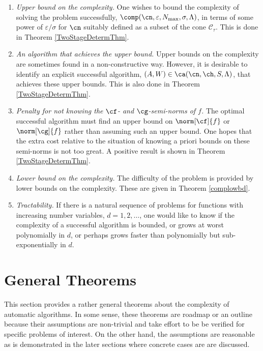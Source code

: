 \documentclass[final]{elsarticle}
\newcommand{\cc}{\mathcal{C}}
\theoremstyle{definition}
\theoremstyle{remark}
\begin{document}
\begin{enumerate}

\renewcommand{\labelenumi}{\roman{enumi}.}

\item \emph{Upper bound on the complexity.}
One wishes to bound the complexity of solving the problem successfully, $\comp(\cn,\varepsilon,N_{\max},\sigma,\Lambda)$, in terms of some power of $\varepsilon/\sigma$ for $\cn$ suitably defined as a subset of the cone $\cc_{\tau}$.  This is done in Theorem \ref{TwoStageDetermThm}.

\item \emph{An algorithm that achieves the upper bound.}  Upper bounds on the complexity are sometimes found in a non-constructive way.  However, it is desirable to identify an explicit successful algorithm, $(A,W) \in \ca(\cn,\ch,S,\Lambda)$, that achieves these upper bounds.  This is also done in Theorem \ref{TwoStageDetermThm}.

\item \emph{Penalty for not knowing the $\cf$- and $\cg$-semi-norms of $f$.} The optimal successful algorithm must find an upper bound on $\norm[\cf]{f}$ or $\norm[\cg]{f}$ rather than assuming such an upper bound.  One hopes that the extra cost relative to the situation of knowing a priori bounds on these semi-norms is not too great.  A positive result is shown in Theorem \ref{TwoStageDetermThm}.

\item \emph{Lower bound on the complexity.}  The difficulty of the problem is provided by lower bounds on the complexity.  These are given in Theorem \ref{complowbd}.

\item \emph{Tractability.}  If there is a natural sequence of problems for functions with increasing number variables, $d=1, 2, \ldots$, one would like to know if the complexity of a successful algorithm is bounded, or grows at worst polynomially in $d$, or perhaps grows faster than polynomially but sub-exponentially in $d$.

\end{enumerate}

\section{General Theorems}

This section provides a rather general theorems about the complexity of automatic algorithms.  In some sense, these theorems are roadmap or an outline because their assumptions are non-trivial and take effort to be be verified for specific problems of interest.  On the other hand, the assumptions are reasonable as is demonstrated in the later sections where concrete cases are are discussed.  
\end{document}
